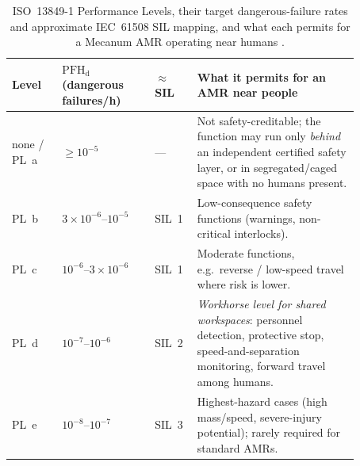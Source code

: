 \documentclass[11pt]{article}
\begin{document}
\begin{table}[t]
  \centering
  \small
  \renewcommand{\arraystretch}{1.25}
  \begin{tabular}{@{}p{0.13\linewidth}p{0.24\linewidth}p{0.08\linewidth}p{0.42\linewidth}@{}}
    \toprule
    \textbf{Level} & \textbf{$\mathrm{PFH_d}$ (dangerous failures/h)} & \textbf{$\approx$SIL}
      & \textbf{What it permits for an AMR near people} \\
    \midrule
    none / PL~a & $\ge 10^{-5}$ & --- &
      Not safety-creditable; the function may run only \emph{behind} an independent
      certified safety layer, or in segregated/caged space with no humans present. \\
    PL~b & $3{\times}10^{-6}$--$10^{-5}$ & SIL~1 &
      Low-consequence safety functions (warnings, non-critical interlocks). \\
    PL~c & $10^{-6}$--$3{\times}10^{-6}$ & SIL~1 &
      Moderate functions, e.g.\ reverse / low-speed travel where risk is lower. \\
    PL~d & $10^{-7}$--$10^{-6}$ & SIL~2 &
      \emph{Workhorse level for shared workspaces}: personnel detection, protective
      stop, speed-and-separation monitoring, forward travel among humans. \\
    PL~e & $10^{-8}$--$10^{-7}$ & SIL~3 &
      Highest-hazard cases (high mass/speed, severe-injury potential); rarely
      required for standard AMRs. \\
    \bottomrule
  \end{tabular}
  \caption{ISO~13849-1 Performance Levels, their target dangerous-failure rates and
  approximate IEC~61508 SIL mapping, and what each permits for a Mecanum AMR
  operating near humans \cite{iso13849,iec61508,iso3691_4}.}
  \label{tab:pl-sil}
\end{table}
\end{document}
